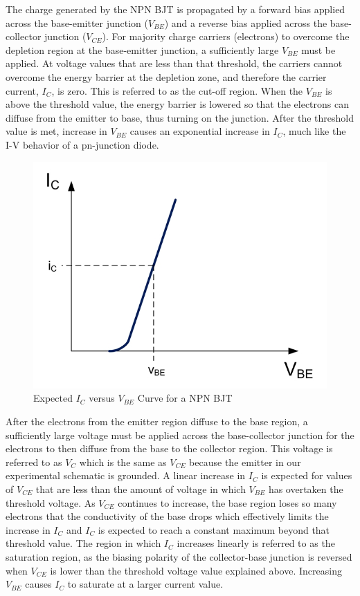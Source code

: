 The charge generated by the  NPN BJT is propagated by a forward bias applied across the base-emitter junction ($V_{BE}$) and a reverse bias applied across the base-collector junction ($V_{CE}$). For majority charge carriers (electrons) to overcome the depletion region at the base-emitter junction, a sufficiently large $V_{BE}$ must be applied. At voltage values that are less than that threshold, the carriers cannot overcome the energy barrier at the depletion zone, and therefore the carrier current, $I_C$, is zero. This is referred to as the cut-off region. When the $V_{BE}$ is above the threshold value, the energy barrier is lowered so that the electrons can diffuse from the emitter to base, thus turning on the junction. After the threshold value is met, increase in $V_{BE}$ causes an exponential increase in $I_C$, much like the I-V behavior of a pn-junction diode.

\FloatBarrier

\begin{figure}[h!]
	\centering
	\includegraphics[scale=3]{../images/bjt_ic_vbe_expected.PNG}
	\caption{Expected $I_C$ versus $V_{BE}$ Curve for a NPN BJT}
	\label{fig:ic_vs_vbe}
\end{figure}

\FloatBarrier

After the electrons from the emitter region diffuse to the base region, a sufficiently large voltage must be applied across the base-collector junction for the electrons to then diffuse from the base to the collector region. This voltage is referred to as $V_C$ which is the same as $V_{CE}$ because the emitter in our experimental schematic is grounded. A linear increase in $I_C$ is expected for values of $V_{CE}$ that are less than the amount of voltage in which $V_{BE}$ has overtaken the threshold voltage. As $V_{CE}$ continues to increase, the base region loses so many electrons that the conductivity of the base drops which effectively limits the increase in $I_C$ and $I_C$ is expected to reach a constant maximum beyond that threshold value. The region in which $I_C$ increases linearly is referred to as the saturation region, as the biasing polarity of the collector-base junction is reversed when $V_{CE}$ is lower than the threshold voltage value explained above. Increasing $V_{BE}$ causes $I_C$ to saturate at a larger current value.


